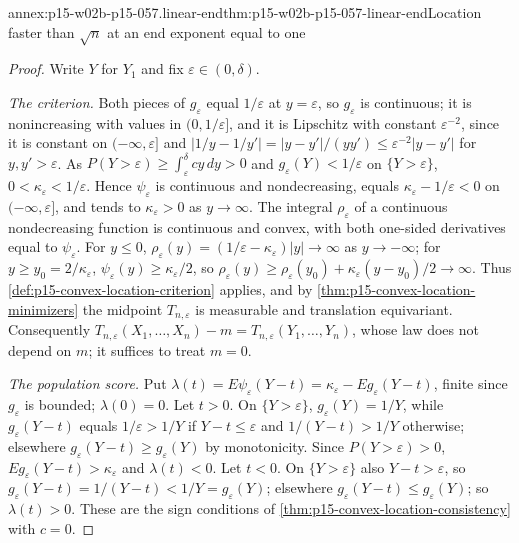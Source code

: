 \begin{annexitem}{annex:p15-w02b-p15-057.linear-end}{thm:p15-w02b-p15-057-linear-end}{Location faster than \(\sqrt n\) at an end exponent equal to one}
\begin{proof}
Write \(Y\) for \(Y_1\) and fix \(\varepsilon\in(0,\delta)\).

\emph{The criterion.} Both pieces of \(g_\varepsilon\) equal
\(1/\varepsilon\) at \(y=\varepsilon\), so \(g_\varepsilon\) is continuous;
it is nonincreasing with values in \((0,1/\varepsilon]\), and it is
Lipschitz with constant \(\varepsilon^{-2}\), since it is constant on
\((-\infty,\varepsilon]\) and
\(|1/y-1/y'|=|y-y'|/(yy')\leq\varepsilon^{-2}|y-y'|\) for
\(y,y'>\varepsilon\). As \(P(Y>\varepsilon)\geq\int_\varepsilon^\delta
cy\,dy>0\) and \(g_\varepsilon(Y)<1/\varepsilon\) on \(\{Y>\varepsilon\}\),
\(0<\kappa_\varepsilon<1/\varepsilon\). Hence \(\psi_\varepsilon\) is
continuous and nondecreasing, equals \(\kappa_\varepsilon-1/\varepsilon<0\)
on \((-\infty,\varepsilon]\), and tends to \(\kappa_\varepsilon>0\) as
\(y\to\infty\). The integral \(\rho_\varepsilon\) of a continuous
nondecreasing function is continuous and convex, with both one-sided
derivatives equal to \(\psi_\varepsilon\). For \(y\leq0\),
\(\rho_\varepsilon(y)=(1/\varepsilon-\kappa_\varepsilon)|y|\to\infty\) as
\(y\to-\infty\); for \(y\geq y_0=2/\kappa_\varepsilon\),
\(\psi_\varepsilon(y)\geq\kappa_\varepsilon/2\), so
\(\rho_\varepsilon(y)\geq\rho_\varepsilon(y_0)+\kappa_\varepsilon(y-y_0)/2\to\infty\).
Thus \cref{def:p15-convex-location-criterion} applies, and by
\cref{thm:p15-convex-location-minimizers} the midpoint \(T_{n,\varepsilon}\)
is measurable and translation equivariant. Consequently
\(T_{n,\varepsilon}(X_1,\ldots,X_n)-m=T_{n,\varepsilon}(Y_1,\ldots,Y_n)\),
whose law does not depend on \(m\); it suffices to treat \(m=0\).

\emph{The population score.} Put
\(\lambda(t)=E\psi_\varepsilon(Y-t)=\kappa_\varepsilon-Eg_\varepsilon(Y-t)\),
finite since \(g_\varepsilon\) is bounded; \(\lambda(0)=0\). Let \(t>0\). On
\(\{Y>\varepsilon\}\), \(g_\varepsilon(Y)=1/Y\), while
\(g_\varepsilon(Y-t)\) equals \(1/\varepsilon>1/Y\) if \(Y-t\leq\varepsilon\)
and \(1/(Y-t)>1/Y\) otherwise; elsewhere
\(g_\varepsilon(Y-t)\geq g_\varepsilon(Y)\) by monotonicity. Since
\(P(Y>\varepsilon)>0\), \(Eg_\varepsilon(Y-t)>\kappa_\varepsilon\) and
\(\lambda(t)<0\). Let \(t<0\). On \(\{Y>\varepsilon\}\) also
\(Y-t>\varepsilon\), so \(g_\varepsilon(Y-t)=1/(Y-t)<1/Y=g_\varepsilon(Y)\);
elsewhere \(g_\varepsilon(Y-t)\leq g_\varepsilon(Y)\); so \(\lambda(t)>0\).
These are the sign conditions of \cref{thm:p15-convex-location-consistency}
with \(c=0\).


\end{proof}
\end{annexitem}
